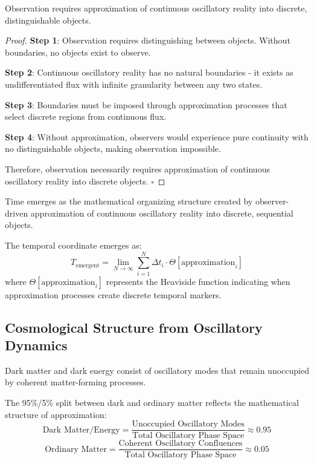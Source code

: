 \documentclass[11pt,a4paper]{article}
\begin{document}
\begin{theorem}
Observation requires approximation of continuous oscillatory reality into discrete, distinguishable objects.
\end{theorem}

\begin{proof}
\textbf{Step 1}: Observation requires distinguishing between objects. Without boundaries, no objects exist to observe.

\textbf{Step 2}: Continuous oscillatory reality has no natural boundaries - it exists as undifferentiated flux with infinite granularity between any two states.

\textbf{Step 3}: Boundaries must be imposed through approximation processes that select discrete regions from continuous flux.

\textbf{Step 4}: Without approximation, observers would experience pure continuity with no distinguishable objects, making observation impossible.

Therefore, observation necessarily requires approximation of continuous oscillatory reality into discrete objects. $\square$
\end{proof}

\begin{definition}
Time emerges as the mathematical organizing structure created by observer-driven approximation of continuous oscillatory reality into discrete, sequential objects.
\end{definition}

The temporal coordinate emerges as:
$$T_{\text{emergent}} = \lim_{N \to \infty} \sum_{i=1}^{N} \Delta t_i \cdot \Theta[\text{approximation}_i]$$
where $\Theta[\text{approximation}_i]$ represents the Heaviside function indicating when approximation processes create discrete temporal markers.

\subsection{Cosmological Structure from Oscillatory Dynamics}

\begin{definition}
Dark matter and dark energy consist of oscillatory modes that remain unoccupied by coherent matter-forming processes.
\end{definition}

The 95\%/5\% split between dark and ordinary matter reflects the mathematical structure of approximation:
$$\text{Dark Matter/Energy} = \frac{\text{Unoccupied Oscillatory Modes}}{\text{Total Oscillatory Phase Space}} \approx 0.95$$
$$\text{Ordinary Matter} = \frac{\text{Coherent Oscillatory Confluences}}{\text{Total Oscillatory Phase Space}} \approx 0.05$$
\end{document}
